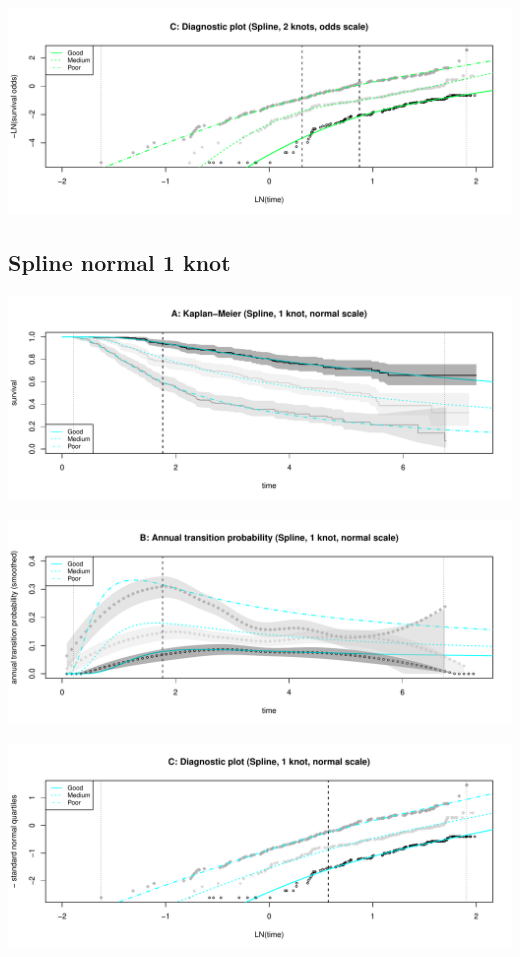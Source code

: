 \documentclass[]{article}
\begin{document}
\begin{flushleft}\includegraphics[height=0.3\textheight]{images/spline_odds2-3} \end{flushleft}

\subsection{Spline normal 1 knot}\label{spline-normal-1-knot}

\begin{flushleft}\includegraphics[height=0.3\textheight]{images/spline_norm1-1} \end{flushleft}

\begin{flushleft}\includegraphics[height=0.3\textheight]{images/spline_norm1-2} \end{flushleft}

\begin{flushleft}\includegraphics[height=0.3\textheight]{images/spline_norm1-3} \end{flushleft}
\end{document}
